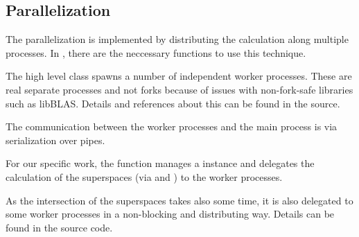 \subsection{Parallelization}
\label{impl:parallelization}

The parallelization is implemented by distributing the calculation along multiple processes. In , there are the neccessary functions to use this technique.

The high level class  spawns a number of independent worker processes. These are real separate processes and not forks because of issues with non-fork-safe libraries such as libBLAS. Details and references about this can be found in the source.

The communication between the worker processes and the main process is via serialization over pipes.

For our specific work, the function  manages a  instance and delegates the calculation of the superspaces (via  and ) to the worker processes.

As the intersection of the superspaces takes also some time, it is also delegated to some worker processes in a non-blocking and distributing way. Details can be found in the source code.

